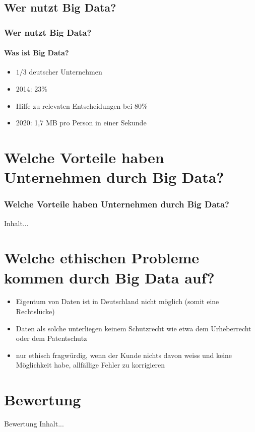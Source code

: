\documentclass[10pt,a4paper]{beamer}
\begin{document}
\subsection{Wer nutzt Big Data?}
\begin{frame}
\frametitle{Wer nutzt Big Data?}
\framesubtitle{Was ist Big Data?}
\begin{itemize}
\item \( 1/3\) deutscher Unternehmen
\pause
\item 2014: 23\%
\pause
\item Hilfe zu relevaten Entscheidungen bei 80\%
\pause
\item 2020: 1,7 MB pro Person in einer Sekunde 
\end{itemize}
\end{frame}

\section{Welche Vorteile haben Unternehmen durch Big Data?}
\begin{frame}
\frametitle{Welche Vorteile haben Unternehmen durch Big Data?}
Inhalt...
\end{frame}

\section{Welche ethischen Probleme kommen durch Big Data auf?}
\begin{frame}
\begin{itemize}
\frametitle{Welche ethischen Probleme kommen durch Big Data auf?}
\item Eigentum von Daten ist in Deutschland nicht möglich (somit eine Rechtslücke)
\pause
\item Daten als solche unterliegen keinem Schutzrecht wie etwa dem Urheberrecht oder dem Patentschutz 
\item nur ethisch fragwürdig, wenn der Kunde nichts davon weiss und keine Möglichkeit habe, allfällige Fehler zu korrigieren
\end{itemize}
\end{frame}

\section{Bewertung}
\begin{frame}{Bewertung}
Inhalt...
\end{frame}
\end{document}
